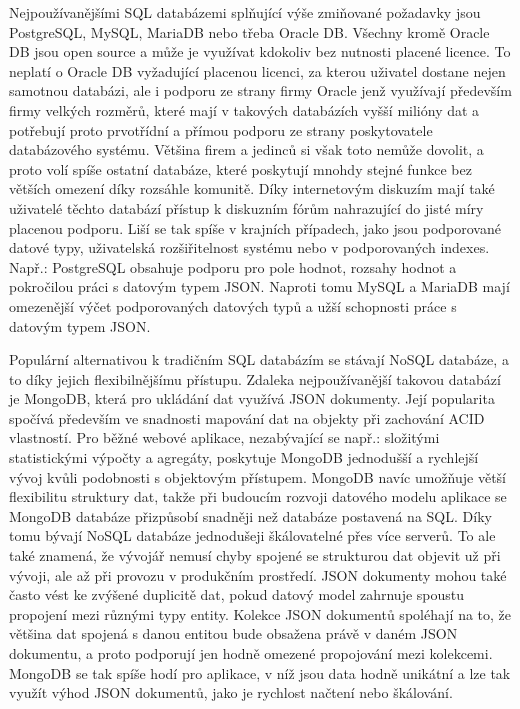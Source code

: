 		Nejpoužívanějšími \Ac{SQL} databázemi splňující výše zmiňované požadavky jsou PostgreSQL, MySQL, MariaDB
		nebo třeba Oracle DB.
		Všechny kromě Oracle DB jsou open source a může je využívat kdokoliv bez nutnosti placené licence.
		To neplatí o Oracle DB vyžadující placenou licenci, za kterou uživatel dostane nejen samotnou databázi, ale
		i podporu ze strany firmy Oracle jenž využívají především firmy velkých rozměrů, které mají v takových databázích
		vyšší milióny dat a potřebují proto prvotřídní a přímou podporu ze strany poskytovatele databázového systému.
		Většina firem a jedinců si však toto nemůže dovolit, a proto volí spíše ostatní databáze, které poskytují mnohdy
		stejné funkce bez větších omezení díky rozsáhle komunitě.
		Díky internetovým diskuzím mají také uživatelé těchto databází přístup k diskuzním fórům nahrazující do jisté míry
		placenou podporu.
		Liší se tak spíše v krajních případech, jako jsou podporované datové typy, uživatelská rozšiřitelnost systému
		nebo v podporovaných indexes.
		Např.: PostgreSQL obsahuje podporu pro pole hodnot, rozsahy hodnot a pokročilou práci s datovým typem \Ac{JSON}.
		Naproti tomu MySQL a MariaDB mají omezenější výčet podporovaných datových typů a užší schopnosti práce s datovým
		typem \Ac{JSON}.

		Populární alternativou k tradičním \Ac{SQL} databázím se stávají \Ac{NoSQL} databáze, a to
		díky jejich flexibilnějšímu přístupu.
		Zdaleka nejpoužívanější takovou databází je MongoDB, která pro ukládání dat využívá \Ac{JSON} dokumenty.
		Její popularita spočívá především ve snadnosti mapování dat na objekty při zachování \Ac{ACID} vlastností.
		Pro běžné webové aplikace, nezabývající se např.: složitými statistickými výpočty a agregáty, poskytuje MongoDB
		jednodušší a rychlejší vývoj kvůli podobnosti s objektovým přístupem.
		MongoDB navíc umožňuje větší flexibilitu struktury dat, takže při budoucím rozvoji datového modelu aplikace se
		MongoDB databáze přizpůsobí snadněji než databáze postavená na \Ac{SQL}.
		Díky tomu bývají \Ac{NoSQL} databáze jednodušeji škálovatelné přes více serverů.\cite{when_to_use_nosql}
		To ale také znamená, že vývojář nemusí chyby spojené se strukturou dat objevit už při vývoji, ale až při provozu
		v produkčním prostředí.
		\Ac{JSON} dokumenty mohou také často vést ke zvýšené duplicitě dat, pokud datový model zahrnuje spoustu
		propojení mezi různými typy entity.
		Kolekce \Ac{JSON} dokumentů spoléhají na to, že většina dat
		spojená s danou entitou bude obsažena právě v daném \Ac{JSON} dokumentu, a proto podporují jen hodně
		omezené propojování mezi kolekcemi.
		MongoDB se tak spíše hodí pro aplikace, v níž jsou data hodně unikátní a lze tak využít výhod \Ac{JSON}
		dokumentů, jako je rychlost načtení nebo škálování.\cite{why_you_should_never_use_mongodb}

